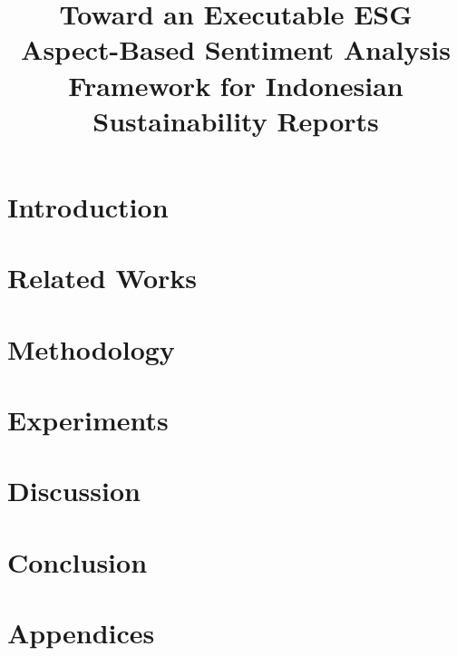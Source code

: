 \documentclass[english, online, cse, master]{dithesis}
\title{Toward an Executable ESG Aspect-Based Sentiment Analysis Framework for Indonesian Sustainability Reports}
\begin{document}
\pagestyle{empty}
\maketitlepage
\makecopyrightpage

 {
  
  
}

\contents %


    
\mainmatter

\chapter{Introduction} %
  \label{introduction} %
    
\chapter{Related Works}
  \label{relatedwork}
  
    
\chapter{Methodology}
  \label{implementation}
  
    
\chapter{Experiments}
  \label{experiments}
  

\chapter{Discussion}
  \label{discussion}
  
  
\chapter{Conclusion}
  \label{summary}
  
    
\printbibliography[heading=bibnumbered, title=\mybibname]

\startappendix
\chapter{Appendices}
  
\end{document}
